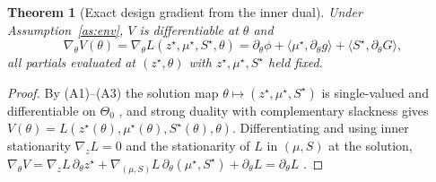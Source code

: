 \documentclass[twocolumn,amsthm]{autart}
\newtheorem{theorem}{Theorem}
\begin{document}
\begin{theorem}[Exact design gradient from the inner dual]\label{prop:envelope}
Under Assumption~\ref{as:env}, $V$ is differentiable at $\theta$ and
\begin{equation}\label{eq:envelope}
\nabla_\theta V(\theta) = \nabla_\theta L(z^\star,\mu^\star,S^\star,\theta)
= \partial_\theta \phi + \langle \mu^\star, \partial_\theta g\rangle
+ \langle S^\star, \partial_\theta G\rangle,
\end{equation}
all partials evaluated at $(z^\star,\theta)$ with $z^\star,\mu^\star,S^\star$
held fixed.
\end{theorem}
\begin{proof}
By (A1)--(A3) the solution map $\theta\mapsto(z^\star,\mu^\star,S^\star)$ is
single-valued and differentiable on $\Theta_0$
\cite{bonnans2000perturbation,shapiro1997differentiability}, and strong duality
with complementary slackness gives
$V(\theta) = L(z^\star(\theta),\mu^\star(\theta),S^\star(\theta),\theta)$.
Differentiating and using inner stationarity $\nabla_z L = 0$ and the
stationarity of $L$ in $(\mu,S)$ at the solution,
$\nabla_\theta V = \nabla_z L\,\partial_\theta z^\star
+ \nabla_{(\mu,S)}L\,\partial_\theta(\mu^\star,S^\star) + \partial_\theta L
= \partial_\theta L$ \cite{milgrom2002envelope,bonnans2000perturbation}.
\end{proof}
\end{document}
